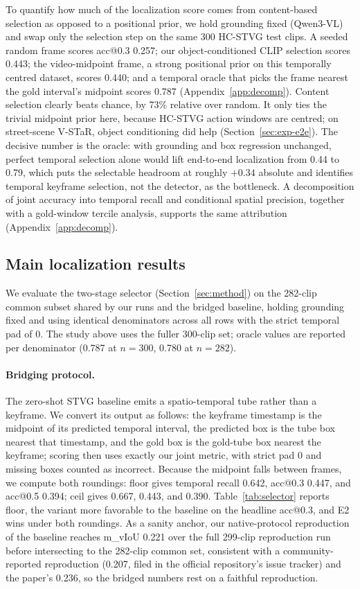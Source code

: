 To quantify how much of the localization score comes from content-based selection as opposed to a positional prior, we hold grounding fixed (Qwen3-VL) and swap only the selection step on the same 300 HC-STVG test clips. A seeded random frame scores acc@0.3 0.257; our object-conditioned CLIP selection scores 0.443; the video-midpoint frame, a strong positional prior on this temporally centred dataset, scores 0.440; and a temporal oracle that picks the frame nearest the gold interval's midpoint scores 0.787 (Appendix~\ref{app:decomp}). Content selection clearly beats chance, by 73\% relative over random. It only ties the trivial midpoint prior here, because HC-STVG action windows are centred; on street-scene V-STaR, object conditioning did help (Section~\ref{sec:exp-e2e}). The decisive number is the oracle: with grounding and box regression unchanged, perfect temporal selection alone would lift end-to-end localization from 0.44 to 0.79, which puts the selectable headroom at roughly $+0.34$ absolute and identifies temporal keyframe selection, not the detector, as the bottleneck. A decomposition of joint accuracy into temporal recall and conditional spatial precision, together with a gold-window tercile analysis, supports the same attribution (Appendix~\ref{app:decomp}).

\subsection{Main localization results}\label{sec:exp-select}

We evaluate the two-stage selector (Section~\ref{sec:method}) on the 282-clip common subset shared by our runs and the bridged baseline, holding grounding fixed and using identical denominators across all rows with the strict temporal pad of 0. The study above uses the fuller 300-clip set; oracle values are reported per denominator (0.787 at $n=300$, 0.780 at $n=282$).

\paragraph{Bridging protocol.}
The zero-shot STVG baseline \citep{zeroshotstvg2509} emits a spatio-temporal tube rather than a keyframe. We convert its output as follows: the keyframe timestamp is the midpoint of its predicted temporal interval, the predicted box is the tube box nearest that timestamp, and the gold box is the gold-tube box nearest the keyframe; scoring then uses exactly our joint metric, with strict pad 0 and missing boxes counted as incorrect. Because the midpoint falls between frames, we compute both roundings: floor gives temporal recall 0.642, acc@0.3 0.447, and acc@0.5 0.394; ceil gives 0.667, 0.443, and 0.390. Table~\ref{tab:selector} reports floor, the variant more favorable to the baseline on the headline acc@0.3, and E2 wins under both roundings. As a sanity anchor, our native-protocol reproduction of the baseline reaches m\_vIoU 0.221 over the full 299-clip reproduction run before intersecting to the 282-clip common set, consistent with a community-reported reproduction (0.207, filed in the official repository's issue tracker) and the paper's 0.236, so the bridged numbers rest on a faithful reproduction.

